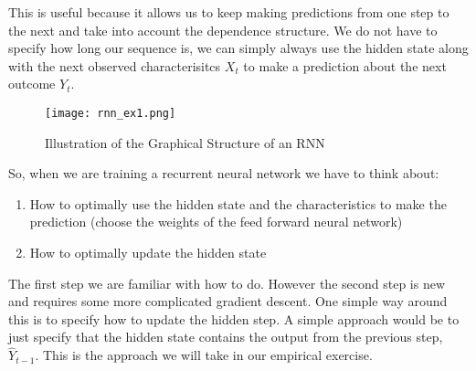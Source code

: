 \documentclass[10pt]{article}
\begin{document}
This is useful because it allows us to keep making predictions from one step to the next and take into account the dependence structure. We do not have to specify how long our sequence is, we can simply always use the hidden state along with the next observed characterisitcs \(X_t\) to  make a prediction about the next outcome \(Y_t\). 

\begin{figure}[htpb]
	\centering
	\texttt{[image: rnn\_ex1.png]}
	\caption{Illustration of the Graphical Structure of an RNN}%
	\label{fig:name}
\end{figure}

So, when we are training a recurrent neural network we have to think about:
\begin{enumerate}
	\item How to optimally use the hidden state and the characteristics to make the prediction (choose the weights of the feed forward neural network)
	\item How to optimally update the hidden state
\end{enumerate}
The first step we are familiar with how to do. However the second step is new and requires some more complicated gradient descent. One simple way around this is to specify how to update the hidden step. A simple approach would be to just specify that the hidden state contains the output from the previous step, \(\hat Y_{t-1}\). This is the approach we will take in our empirical exercise.
\end{document}
